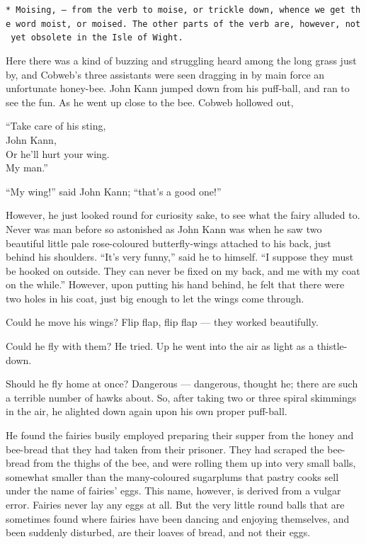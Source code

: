 \documentclass[
  12pt,
  a5paper,
  twoside]{book}
\let\oldtexttt\texttt        %
\renewcommand{\texttt}[1]{{\footnotesize\oldtexttt{#1}}}
\begin{document}
\texttt{*\ Moising,\ —\ from\ the\ verb\ to\ moise,\ or\ trickle\ down,\ whence\ we\ get\ the\ word\ moist,\ or\ moised.\ The\ other\ parts\ of\ the\ verb\ are,\ however,\ not\ yet\ obsolete\ in\ the\ Isle\ of\ Wight.}

Here there was a kind of buzzing and struggling heard among the long
grass just by, and Cobweb's three assistants were seen dragging in by
main force an unfortunate honey-bee. John Kann jumped down from his
puff-ball, and ran to see the fun. As he went up close to the bee.
Cobweb hollowed out,

``Take care of his sting,\\
John Kann,\\
Or he'll hurt your wing.\\
My man.''

``My wing!'' said John Kann; ``that's a good one!''

However, he just looked round for curiosity sake, to see what the fairy
alluded to. Never was man before so astonished as John Kann was when he
saw two beautiful little pale rose-coloured butterfly-wings attached to
his back, just behind his shoulders. ``It's very funny,'' said he to
himself. ``I suppose they must be hooked on outside. They can never be
fixed on my back, and me with my coat on the while.'' However, upon
putting his hand behind, he felt that there were two holes in his coat,
just big enough to let the wings come through.

Could he move his wings? Flip flap, flip flap --- they worked
beautifully.

Could he fly with them? He tried. Up he went into the air as light as a
thistle-down.

Should he fly home at once? Dangerous --- dangerous, thought he; there
are such a terrible number of hawks about. So, after taking two or three
spiral skimmings in the air, he alighted down again upon his own proper
puff-ball.

He found the fairies busily employed preparing their supper from the
honey and bee-bread that they had taken from their prisoner. They had
scraped the bee-bread from the thighs of the bee, and were rolling them
up into very small balls, somewhat smaller than the many-coloured
sugarplums that pastry cooks sell under the name of fairies' eggs. This
name, however, is derived from a vulgar error. Fairies never lay any
eggs at all. But the very little round balls that are sometimes found
where fairies have been dancing and enjoying themselves, and been
suddenly disturbed, are their loaves of bread, and not their eggs.
\end{document}
